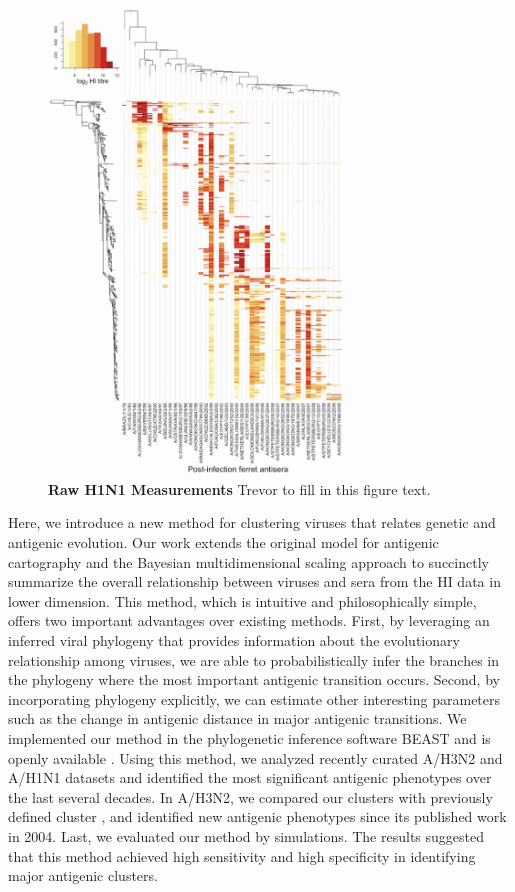 \documentclass[11pt,oneside,letterpaper]{article}
\begin{document}
\begin{figure}[h]
	\centering		
	\includegraphics[width=0.7\textwidth]{figures/custom/H1titerheatmap}
	\caption{\textbf{Raw H1N1 Measurements} 
Trevor to fill in this figure text.
		} 
	\label{H1N1titer} 
\end{figure}

Here, we introduce a new method for clustering viruses that relates genetic and antigenic evolution. 
Our work extends the original model for antigenic cartography \cite{smith_mapping_2004} and the Bayesian multidimensional scaling approach \cite{bedford_integrating_2014} to succinctly summarize the overall relationship between viruses and sera from the HI data in lower dimension.
This method, which is intuitive and philosophically simple, offers two important advantages over existing methods. 
First, by leveraging an inferred viral phylogeny that provides information about the evolutionary relationship among viruses, we are able to probabilistically infer the branches in the phylogeny where the most important antigenic transition occurs. 
Second, by incorporating phylogeny explicitly, we can estimate other interesting parameters such as the change in antigenic distance in major antigenic transitions. 
We implemented our method in the phylogenetic inference software BEAST and is openly available \cite{BEAST17}.
Using this method, we analyzed recently curated A/H3N2 and A/H1N1 datasets and identified the most significant antigenic phenotypes over the last several decades. 
In A/H3N2, we compared our clusters with previously defined cluster \cite{smith_mapping_2004}, and identified new antigenic phenotypes since its published work in 2004. 
Last, we evaluated our method by simulations.
The results suggested that this method achieved high sensitivity and high specificity in identifying major antigenic clusters.
\end{document}
